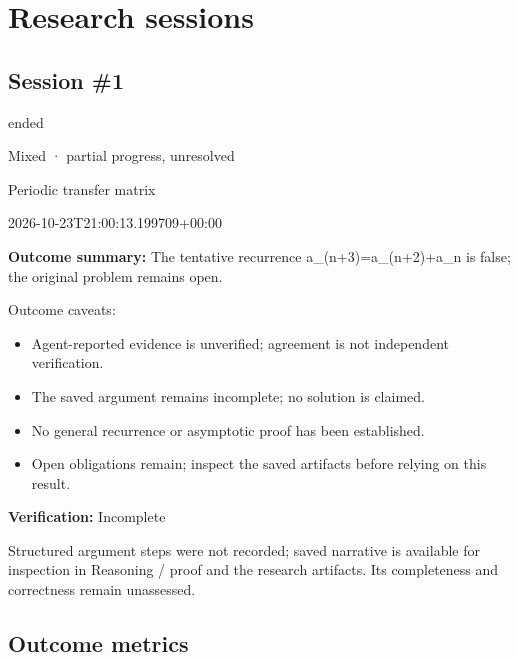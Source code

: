 \documentclass[11pt]{article}
\begin{document}
\section{Research sessions}
\subsection{Session \#1}
\begin{description}[style=nextline,font=\normalfont\bfseries,leftmargin=0pt,labelsep=0pt]
\item[Execution status] ended
\item[Outcome] Mixed · partial progress, unresolved
\item[Strategy] Periodic transfer matrix
\item[Started] 2026-10-23T21:00:13.199709+00:00
\end{description}
\textbf{Outcome summary:} The tentative recurrence a\_(n+3)=a\_(n+2)+a\_n is false; the original problem remains open.\par
Outcome caveats:\par
\begin{itemize}
\item Agent-reported evidence is unverified; agreement is not independent verification.
\item The saved argument remains incomplete; no solution is claimed.
\item No general recurrence or asymptotic proof has been established.
\item Open obligations remain; inspect the saved artifacts before relying on this result.
\end{itemize}
\textbf{Verification:} Incomplete\par
Structured argument steps were not recorded; saved narrative is available for inspection in Reasoning / proof and the research artifacts. Its completeness and correctness remain unassessed.\par
\subsection{Outcome metrics}
\end{document}
